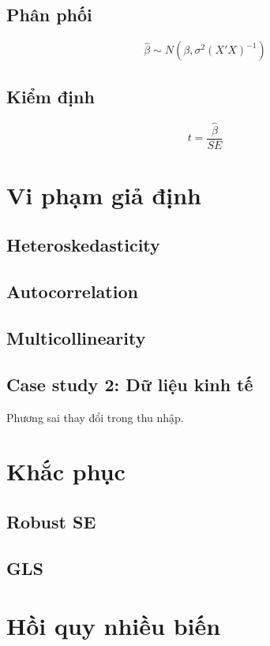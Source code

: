 \documentclass[12pt,a4paper]{book}
\begin{document}
\section{Phân phối}
\[
\hat{\beta} \sim N(\beta, \sigma^2(X'X)^{-1})
\]

\section{Kiểm định}
\[
t = \frac{\hat{\beta}}{SE}
\]

\chapter{Vi phạm giả định}

\section{Heteroskedasticity}
\section{Autocorrelation}
\section{Multicollinearity}

\section{Case study 2: Dữ liệu kinh tế}
Phương sai thay đổi trong thu nhập.

\chapter{Khắc phục}

\section{Robust SE}
\section{GLS}

\chapter{Hồi quy nhiều biến}
\end{document}

